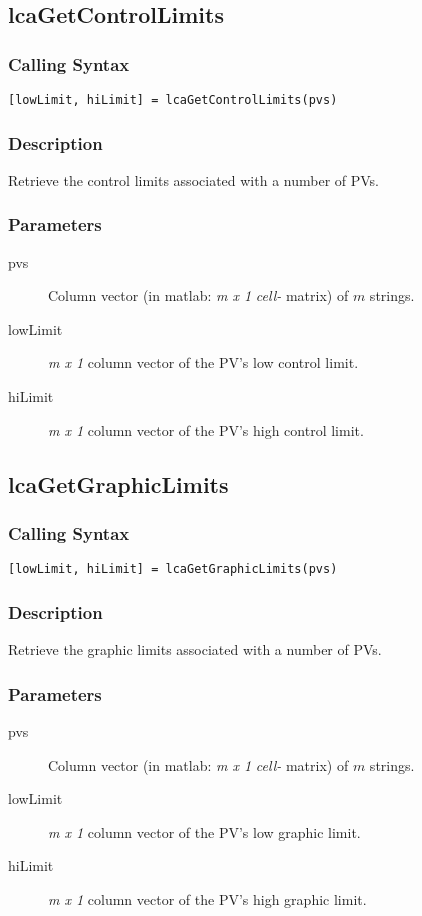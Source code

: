 \documentclass{article}
\newcommand{\pbrkf}{\pagebreak}
\newcommand{\ita}[1]{\emph{#1}}
\newcommand{\m}{$m$}
\newcommand{\mhack}{$m$} %
\newcommand{\mxl}{$m\times 1$}
\renewcommand{\m}{\ita{m}}
\newcommand{\mhack}{\ita{m}} %
\renewcommand{\mxl}{\ita{m x 1}}
\renewcommand{\pbrkf}{}
\newcommand{\PVITEM}{
\item[pvs] Column vector (in matlab: \mxl{} \ita{cell-} matrix)
of \mhack{} strings.
}
\begin{document}
\subsection{lcaGetControlLimits}
\subsubsection{Calling Syntax}
\begin{verbatim}
[lowLimit, hiLimit] = lcaGetControlLimits(pvs)
\end{verbatim}
\subsubsection{Description}
Retrieve the control limits associated with a number of PVs.
\subsubsection{Parameters}
\begin{description}
\PVITEM
\item[lowLimit] \mxl{} column vector of the PV's low control limit.
\item[hiLimit]  \mxl{} column vector of the PV's high control limit.
\end{description}


\pbrkf
\subsection{lcaGetGraphicLimits}
\subsubsection{Calling Syntax}
\begin{verbatim}
[lowLimit, hiLimit] = lcaGetGraphicLimits(pvs)
\end{verbatim}
\subsubsection{Description}
Retrieve the graphic limits associated with a number of PVs.
\subsubsection{Parameters}
\begin{description}
\PVITEM
\item[lowLimit] \mxl{} column vector of the PV's low graphic limit.
\item[hiLimit]  \mxl{} column vector of the PV's high graphic limit.
\end{description}
\end{document}
